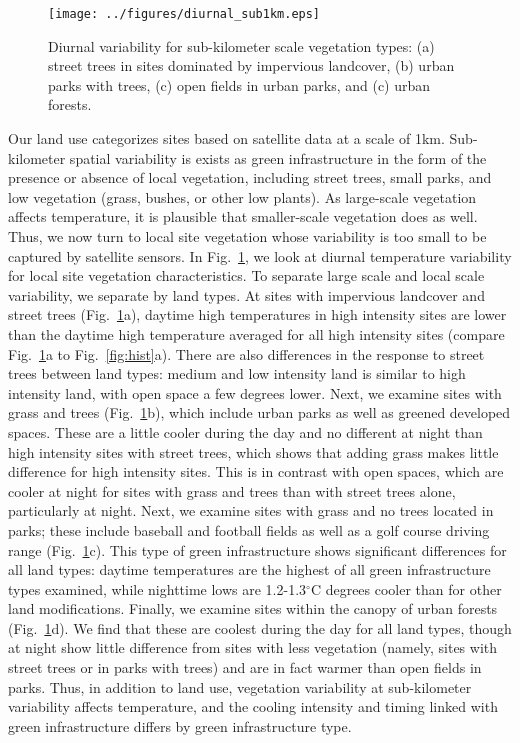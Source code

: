 \documentclass[draft,linenumbers]{agujournal}
\begin{document}
\begin{figure}
\centering
\texttt{[image: ../figures/diurnal\_sub1km.eps]}
\caption{Diurnal variability for sub-kilometer scale vegetation types: (a) street trees in sites dominated by impervious landcover, (b) urban parks with trees, (c) open fields in urban parks, and (c) urban forests. }
\label{fig:diurnal_urbanforests_etc}
\end{figure}

Our land use categorizes sites based on satellite data at a scale of 1km.  Sub-kilometer spatial variability is exists as green infrastructure in the form of the presence or absence of local vegetation, including street trees, small parks, and low vegetation (grass, bushes, or other low plants). As large-scale vegetation affects temperature, it is plausible that smaller-scale vegetation does as well. 
Thus, we now turn to local site vegetation whose variability is too small to be captured by satellite sensors. 
In Fig.~\ref{fig:diurnal_urbanforests_etc}, we look at diurnal temperature variability for local site vegetation characteristics. To separate large scale and local scale variability, we separate by land types. 
At sites with impervious landcover and street trees (Fig.~\ref{fig:diurnal_urbanforests_etc}a), %
daytime high temperatures in high intensity sites are lower than the daytime high temperature averaged for all high intensity sites (compare Fig.~\ref{fig:diurnal_urbanforests_etc}a to Fig.~\ref{fig:hist}a).
There are also differences in the response to street trees between land types: 
medium and low intensity land is similar to high intensity land, with open space a few degrees lower. 
Next, we examine sites with grass and trees (Fig.~\ref{fig:diurnal_urbanforests_etc}b), which include urban parks as well as greened developed spaces. These are a little cooler during the day and no different at night than high intensity sites with street trees, which shows that adding grass makes little difference for high intensity sites. This is in contrast with open spaces, which are cooler at night for sites with grass and trees than with street trees alone, particularly at night. Next, we examine sites with grass and no trees located in parks; these include baseball and football fields as well as a golf course driving range (Fig.~\ref{fig:diurnal_urbanforests_etc}c). 
This type of green infrastructure shows significant differences for all land types: daytime temperatures are the highest of all green infrastructure types examined, while nighttime lows are 1.2-1.3$^\circ$C degrees cooler than for other land modifications. 
Finally, we examine sites within the canopy of urban forests (Fig.~\ref{fig:diurnal_urbanforests_etc}d). 
We find that these are coolest during the day for all land types, though at night show little difference from sites with less vegetation (namely, sites with street trees or in parks with trees) and are in fact warmer than open fields in parks. 
Thus, in addition to land use, vegetation variability at sub-kilometer variability affects temperature, and the cooling intensity and timing linked with green infrastructure differs by green infrastructure type. 
\end{document}
